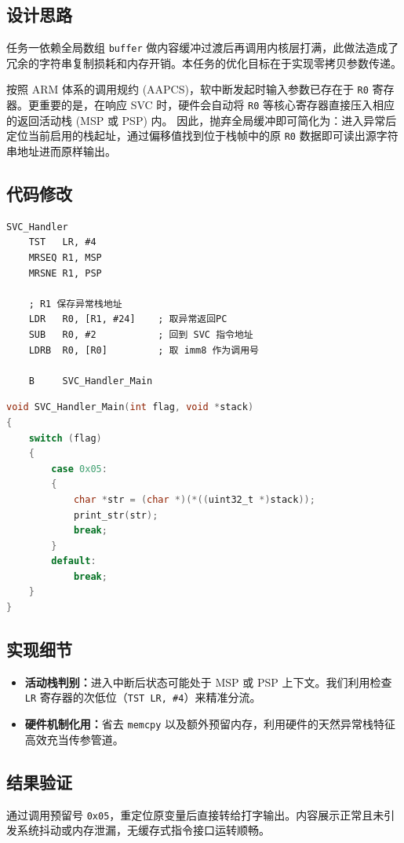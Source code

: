 \documentclass[UTF8]{ctexart}
\begin{document}
\subsection{设计思路}
任务一依赖全局数组 \texttt{buffer} 做内容缓冲过渡后再调用内核层打满，此做法造成了冗余的字符串复制损耗和内存开销。本任务的优化目标在于实现零拷贝参数传递。

按照 ARM 体系的调用规约 (AAPCS)，软中断发起时输入参数已存在于 \texttt{R0} 寄存器。更重要的是，在响应 SVC 时，硬件会自动将 \texttt{R0} 等核心寄存器直接压入相应的返回活动栈 (MSP 或 PSP) 内。
因此，抛弃全局缓冲即可简化为：进入异常后定位当前启用的栈起址，通过偏移值找到位于栈帧中的原 \texttt{R0} 数据即可读出源字符串地址进而原样输出。

\subsection{代码修改}
\begin{lstlisting}[caption=SVC\_Handler 传递栈指针与调用号]
SVC_Handler
    TST   LR, #4
    MRSEQ R1, MSP
    MRSNE R1, PSP

    ; R1 保存异常栈地址
    LDR   R0, [R1, #24]    ; 取异常返回PC
    SUB   R0, #2           ; 回到 SVC 指令地址
    LDRB  R0, [R0]         ; 取 imm8 作为调用号

    B     SVC_Handler_Main
\end{lstlisting}

\begin{lstlisting}[language=C, caption=无缓冲区打印实现]
void SVC_Handler_Main(int flag, void *stack)
{
    switch (flag)
    {
        case 0x05:
        {
            char *str = (char *)(*((uint32_t *)stack));
            print_str(str);
            break;
        }
        default:
            break;
    }
}
\end{lstlisting}

\subsection{实现细节}
\begin{itemize}
    \item \textbf{活动栈判别：}进入中断后状态可能处于 MSP 或 PSP 上下文。我们利用检查 \texttt{LR} 寄存器的次低位（\texttt{TST LR, \#4}）来精准分流。
    \item \textbf{硬件机制化用：}省去 \texttt{memcpy} 以及额外预留内存，利用硬件的天然异常栈特征高效充当传参管道。
\end{itemize}

\subsection{结果验证}
通过调用预留号 \texttt{0x05}，重定位原变量后直接转给打字输出。内容展示正常且未引发系统抖动或内存泄漏，无缓存式指令接口运转顺畅。
\end{document}
